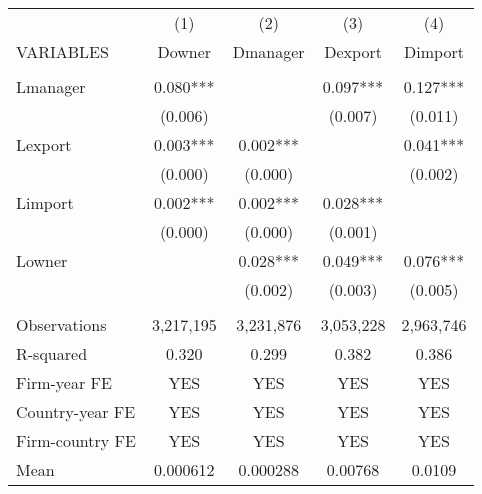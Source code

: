 \begin{tabular}{lcccc} \hline
 & (1) & (2) & (3) & (4) \\
VARIABLES & Downer & Dmanager & Dexport & Dimport \\ \hline
 &  &  &  &  \\
Lmanager & 0.080*** &  & 0.097*** & 0.127*** \\
 & (0.006) &  & (0.007) & (0.011) \\
Lexport & 0.003*** & 0.002*** &  & 0.041*** \\
 & (0.000) & (0.000) &  & (0.002) \\
Limport & 0.002*** & 0.002*** & 0.028*** &  \\
 & (0.000) & (0.000) & (0.001) &  \\
Lowner &  & 0.028*** & 0.049*** & 0.076*** \\
 &  & (0.002) & (0.003) & (0.005) \\
 &  &  &  &  \\
Observations & 3,217,195 & 3,231,876 & 3,053,228 & 2,963,746 \\
R-squared & 0.320 & 0.299 & 0.382 & 0.386 \\
Firm-year FE & YES & YES & YES & YES \\
Country-year FE & YES & YES & YES & YES \\
Firm-country FE & YES & YES & YES & YES \\
 Mean & 0.000612 & 0.000288 & 0.00768 & 0.0109 \\ \hline
\end{tabular}
